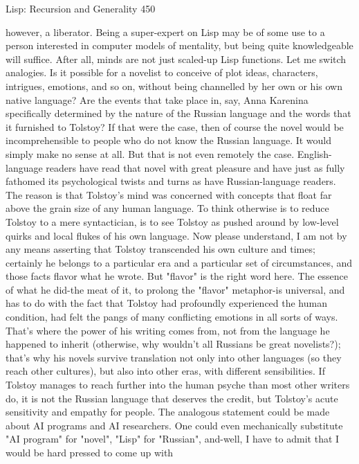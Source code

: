 Lisp: Recursion and Generality                                                         450

however, a liberator. Being a super-expert on Lisp may be of some use to a person
interested in computer models of mentality, but being quite knowledgeable will
suffice. After all, minds are not just scaled-up Lisp functions.
        Let me switch analogies. Is it possible for a novelist to conceive of plot ideas,
characters, intrigues, emotions, and so on, without being channelled by her own or his
own native language? Are the events that take place in, say, Anna Karenina
specifically determined by the nature of the Russian language and the words that it
furnished to Tolstoy? If that were the case, then of course the novel would be
incomprehensible to people who do not know the Russian language. It would simply
make no sense at all. But that is not even remotely the case. English-language readers
have read that novel with great pleasure and have just as fully fathomed its
psychological twists and turns as have Russian-language readers. The reason is that
Tolstoy's mind was concerned with concepts that float far above the grain size of any
human language. To think otherwise is to reduce Tolstoy to a mere syntactician, is to
see Tolstoy as pushed around by low-level quirks and local flukes of his own
language.
        Now please understand, I am not by any means asserting that Tolstoy
transcended his own culture and times; certainly he belongs to a particular era and a
particular set of circumstances, and those facts flavor what he wrote. But "flavor" is
the right word here. The essence of what he did-the meat of it, to prolong the "flavor"
metaphor-is universal, and has to do with the fact that Tolstoy had profoundly
experienced the human condition, had felt the pangs of many conflicting emotions in
all sorts of ways. That's where the power of his writing comes from, not from the
language he happened to inherit (otherwise, why wouldn't all Russians be great
novelists?); that's why his novels survive translation not only into other languages (so
they reach other cultures), but also into other eras, with different sensibilities. If
Tolstoy manages to reach further into the human psyche than most other writers do, it
is not the Russian language that deserves the credit, but Tolstoy's acute sensitivity and
empathy for people.
        The analogous statement could be made about AI programs and AI
researchers. One could even mechanically substitute "AI program" for "novel", "Lisp"
for "Russian", and-well, I have to admit that I would be hard pressed to come up with
